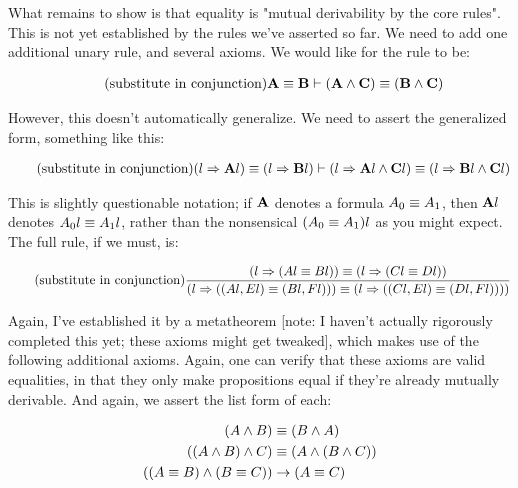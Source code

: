 \documentclass{article}
\begin{document}
  What remains to show is that equality is "mutual derivability by the core rules". This is not yet established by the rules we've asserted so far. We need to add one additional unary rule, and several axioms. We would like for the rule to be:
  
  \begin{align*}
    \tag{substitute in conjunction}\label{subst_c1}
    \mathbf{A} \equiv \mathbf{B} &\vdash (\mathbf{A} \wedge \mathbf{C}) \equiv (\mathbf{B} \wedge \mathbf{C}) \\
  \end{align*}
  
  However, this doesn't automatically generalize. We need to assert the generalized form, something like this:
  
  \begin{align*}
    \tag{substitute in conjunction}\label{subst_c}
    (l \Rightarrow \mathbf{A}l) \equiv (l \Rightarrow \mathbf{B}l) &\vdash (l \Rightarrow \mathbf{A}l \wedge \mathbf{C}l) \equiv (l \Rightarrow \mathbf{B}l \wedge \mathbf{C}l) \\
  \end{align*}
  
  This is slightly questionable notation; if $\mathbf{A}$ denotes a formula $A_0 \equiv A_1$, then $\mathbf{A}l$ denotes $A_0l \equiv A_1l$, rather than the nonsensical $(A_0 \equiv A_1)l$ as you might expect. The full rule, if we must, is:
      
  \begin{align*}
    \tag{substitute in conjunction}\label{subst_c3}
    \frac{(l \Rightarrow (Al \equiv Bl)) \equiv (l \Rightarrow (Cl \equiv Dl))}{(l \Rightarrow ((Al,El) \equiv (Bl,Fl))) \equiv (l \Rightarrow ((Cl,El) \equiv (Dl,Fl))))} \\
  \end{align*}
  
  Again, I've established it by a metatheorem [note: I haven't actually rigorously completed this yet; these axioms might get tweaked], which makes use of the following additional axioms. Again, one can verify that these axioms are valid equalities, in that they only make propositions equal if they're already mutually derivable. And again, we assert the list form of each:
  
  \begin{align*}
    (A \wedge B) &\equiv (B \wedge A)\\
    ((A \wedge B) \wedge C) &\equiv (A \wedge (B \wedge C))\\
    ((A \equiv B) \wedge (B \equiv C)) &\to (A \equiv C)\\
  \end{align*}
  
\end{document}
